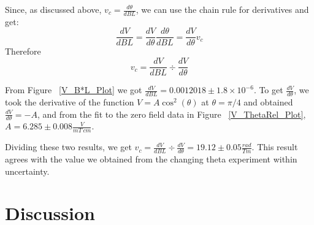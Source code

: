 \documentclass[prb,preprint]{revtex4-1}
\begin{document}
Since, as discussed above, $v_c = \frac{d \theta}{dBL}$, we can use the chain rule for derivatives and get: 
\begin{equation}
\frac{ dV}{ dBL} = \frac{dV}{d\theta} \frac{d\theta}{dBL} = \frac{dV}{d\theta} v_c
\end{equation}
Therefore 
\begin{equation} 
v_c = \frac{dV}{dBL} \div \frac{dV}{d\theta}
\end{equation}

From Figure ~\ref{V_B*L_Plot} we got $\frac{dV}{dBL} = 0.0012018 \pm 1.8 \times 10^{-6}$. To get $\frac{dV}{d\theta}$, we took the derivative of the function $V = A \cos^{2}(\theta)$ at $\theta = \pi/4$ and obtained $\frac{dV}{d\theta} = -A$, and from the fit to the zero field data in Figure ~\ref{V_ThetaRel_Plot}, $A = 6.285 \pm 0.008 \frac{V}{mT\ cm}$.  

Dividing these two results, we get $v_c = \frac{dV}{dBL} \div \frac{dV}{d\theta} = 19.12 \pm 0.05 \frac{rad}{Tm}$.  This result agrees with the value we obtained from the changing theta experiment within uncertainty.






\section{Discussion}
\end{document}
